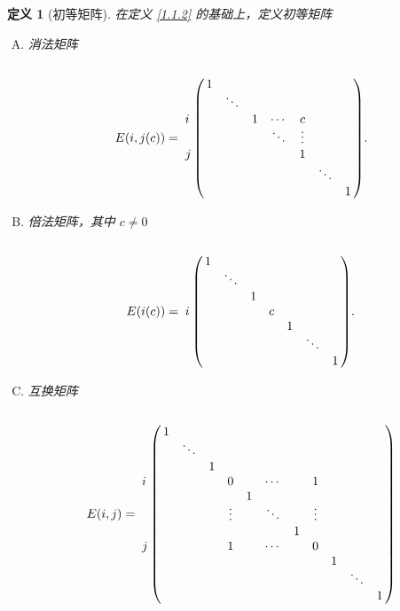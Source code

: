 \documentclass[10pt,openany]{article}
\theoremstyle{thmstyle} %
\theoremstyle{defstyle} %
\newtheorem{definition}[theorem]{定义}
\theoremstyle{prostyle} %
\theoremstyle{exastyle}
\theoremstyle{remstyle}
\begin{document}
\begin{definition}[初等矩阵] 	\label{1.3.3}
	在定义 \ref{1.1.2} 的基础上，定义初等矩阵
	\begin{enumerate}[(A)]
		\item 消法矩阵
		\[ E(i,j(c))=\bordermatrix{
			& & & & & & & \cr
			& 1 & & & & & &  \cr
			& & \ddots & & & & &  \cr
		\textbf{\(i\)}	& & & 1 & \cdots & c & &  \cr
			& & & & \ddots & \vdots & &  \cr
		\textbf{\(j\)}	& & & & & 1 & &  \cr
			& & & & & & \ddots  &  \cr
			& & & & & & & 1 \cr
		}. \]
		\item 倍法矩阵，其中 \( c \neq 0 \)
		\[ E(i(c))=\bordermatrix{
			& & & & & & &  \cr
			& 1 & & & &  & &  \cr
			& & \ddots & & &  & &  \cr
			& & & 1 & &  & &  \cr
			\textbf{\(i\)}	& & & & c & & &   \cr
			& &  & & & 1  & &  \cr
			& & & &  & &\ddots &  \cr
			& & & & & & & 1   \cr
		}. \]
		\item 互换矩阵
		\[
		E(i,j) = \bordermatrix{
			&       &       &       &       &       &       &       &       &       &       &       \cr
			& 1     &       &       &       &       &       &       &       &       &       &       \cr
			&       & \ddots&       &       &       &       &       &       &       &       &       \cr
			&       &       & 1     &       &       &       &       &       &       &       &       \cr
			\textbf{\(i\)} &  &       &       & 0     &       & \cdots&       & 1     &       &       &       \cr
			&       &       &       &       & 1     &       &       &       &       &       &       \cr
			&       &       &       & \vdots&       & \ddots&       & \vdots&       &       &       \cr
			&       &       &       &       &       &       & 1     &       &       &       &       \cr
			\textbf{\(j\)} &  &       &       & 1     &       & \cdots&       & 0     &       &       &       \cr
			&       &       &       &       &       &       &       &       & 1     &       &       \cr
			&       &       &       &       &       &       &       &       &       & \ddots&       \cr
			&       &       &       &       &       &       &       &       &       &       & 1     
		}
		\]
		
	\end{enumerate}

\end{definition}
\end{document}
